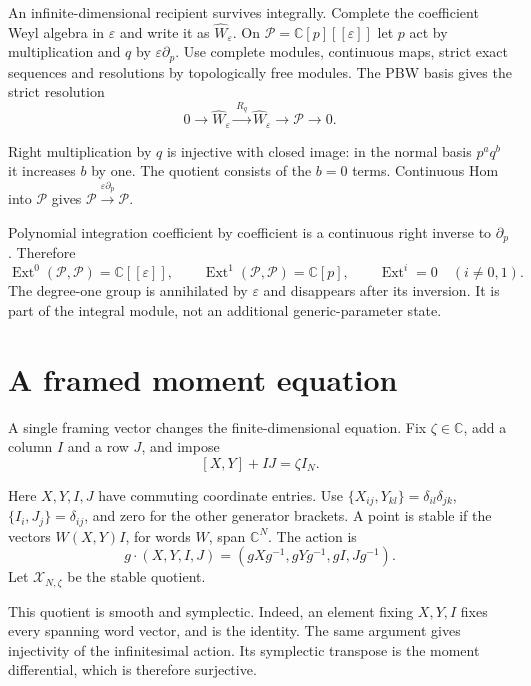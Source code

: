 An infinite-dimensional recipient survives integrally.
Complete the coefficient Weyl algebra in $\varepsilon$ and
write it as $\widehat W_\varepsilon$. On
$\mathcal P=\mathbb C[p][[\varepsilon]]$ let
$p$ act by multiplication and $q$ by
$\varepsilon\partial_p$. Use complete modules, continuous maps,
strict exact sequences and resolutions by topologically free
modules. The PBW basis gives the strict resolution
\[
 0\longrightarrow\widehat W_\varepsilon
 \xrightarrow{\,R_q\,}\widehat W_\varepsilon
 \longrightarrow\mathcal P\longrightarrow0.
\]

Right multiplication by $q$ is injective with closed image:
in the normal basis $p^aq^b$ it increases $b$ by one.
The quotient consists of the $b=0$ terms. Continuous Hom into
$\mathcal P$ gives
$\mathcal P\xrightarrow{\varepsilon\partial_p}\mathcal P$.

Polynomial integration coefficient by coefficient is a
continuous right inverse to $\partial_p$. Therefore
\begin{equation}\label{mht:eq:integral-fock-ext}
 \operatorname{Ext}^0(\mathcal P,\mathcal P)=\mathbb C[[\varepsilon]],
 \qquad
 \operatorname{Ext}^1(\mathcal P,\mathcal P)=\mathbb C[p],
 \qquad \operatorname{Ext}^{i}=0\quad(i\ne0,1).
\end{equation}
The degree-one group is annihilated by $\varepsilon$ and
disappears after its inversion. It is part of the integral
module, not an additional generic-parameter state.

\section{A framed moment equation}

A single framing vector changes the finite-dimensional equation.
Fix $\zeta\in\mathbb C$, add a column $I$ and a row $J$, and impose
\begin{equation}\label{mht:eq:framed-moment}
 [X,Y]+IJ=\zeta I_N.
\end{equation}

Here $X,Y,I,J$ have commuting coordinate entries. Use
$\{X_{ij},Y_{kl}\}=\delta_{il}\delta_{jk}$,
$\{I_i,J_j\}=\delta_{ij}$, and zero for the other generator
brackets. A point is stable if the vectors $W(X,Y)I$, for
words $W$, span $\mathbb C^N$. The action is
\[
 g\cdot(X,Y,I,J)=(gXg^{-1},gYg^{-1},gI,Jg^{-1}).
\]
Let $\mathcal X_{N,\zeta}$ be the stable quotient.

This quotient is smooth and symplectic. Indeed, an element
fixing $X,Y,I$ fixes every spanning word vector, and is the
identity. The same argument gives injectivity of the
infinitesimal action. Its symplectic transpose is the moment
differential, which is therefore surjective.

